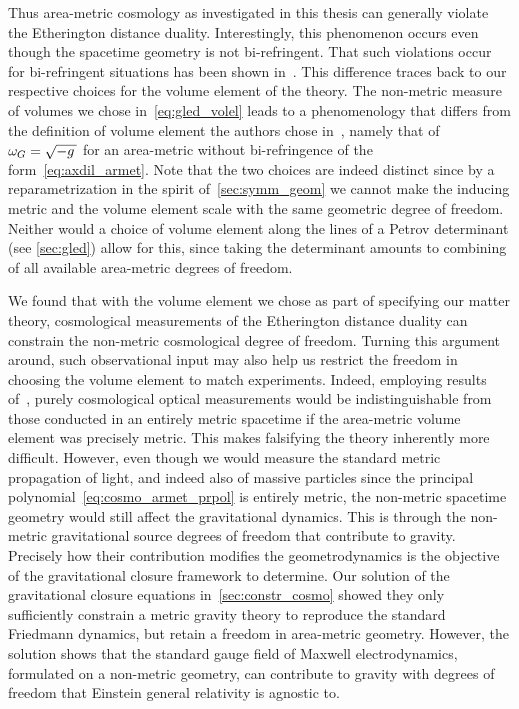 Thus area-metric cosmology as investigated in this thesis can generally violate the Etherington distance duality. Interestingly, this phenomenon occurs even though the spacetime geometry is not bi-refringent. That such violations occur for bi-refringent situations has been shown in~\autocite{EtheringtonNBiref}. This difference traces back to our respective choices for the volume element of the theory. The non-metric measure of volumes we chose in~\eqref{eq:gled_volel} leads to a phenomenology that differs from the definition of volume element the authors chose in~\autocite{EtheringtonNBiref}, namely that of~$\omega_G=\sqrt{-g\,}$ for an area-metric without bi-refringence of the form~\eqref{eq:axdil_armet}. Note that the two choices are indeed distinct since by a reparametrization in the spirit of~\autoref{sec:symm_geom} we cannot make the inducing metric and the volume element scale with the same geometric degree of freedom. Neither would a choice of volume element along the lines of a Petrov determinant (see \autoref{sec:gled}) allow for this, since taking the determinant amounts to combining of all available area-metric degrees of freedom.

We found that with the volume element we chose as part of specifying our matter theory, cosmological measurements of the Etherington distance duality can constrain the non-metric cosmological degree of freedom. Turning this argument around, such observational input may also help us restrict the freedom in choosing the volume element to match experiments. Indeed, employing results of~\autocite{EtheringtonNBiref}, purely cosmological optical measurements would be indistinguishable from those conducted in an entirely metric spacetime if the area-metric volume element was precisely metric. This makes falsifying the theory inherently more difficult. However, even though we would measure the standard metric propagation of light, and indeed also of massive particles since the principal polynomial~\eqref{eq:cosmo_armet_prpol} is entirely metric, the non-metric spacetime geometry would still affect the gravitational dynamics. This is through the non-metric gravitational source degrees of freedom that contribute to gravity. Precisely how their contribution modifies the geometrodynamics is the objective of the gravitational closure framework to determine. Our solution of the gravitational closure equations in~\autoref{sec:constr_cosmo} showed they only sufficiently constrain a metric gravity theory to reproduce the standard Friedmann dynamics, but retain a freedom in area-metric geometry. However, the solution shows that the standard gauge field of Maxwell electrodynamics, formulated on a non-metric geometry, can contribute to gravity with degrees of freedom that Einstein general relativity is agnostic to.

